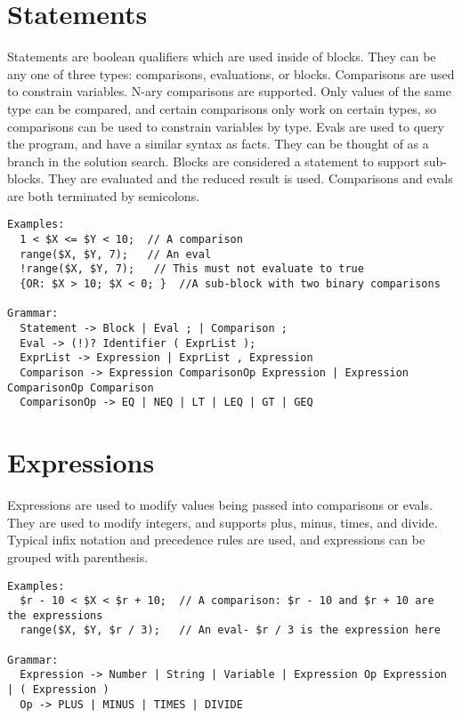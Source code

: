 \documentclass[onecolumn,titlepage]{article}
\begin{document}
\section{Statements}
Statements are boolean qualifiers which are used inside of blocks.  They can be any one
of three types: comparisons, evaluations, or blocks. Comparisons are used to constrain variables.
N-ary comparisons are supported.  Only values of the same type can be compared, and certain
comparisons only work on certain types, so comparisons can be used to constrain variables by 
type.  Evals are used to query the program, and have a similar syntax as facts.  They can be thought
of as a branch in the solution search.  Blocks are considered a statement to support sub-blocks.
They are evaluated and the reduced result is used.  Comparisons and evals are both terminated
by semicolons.

\begin{verbatim}
Examples:
  1 < $X <= $Y < 10;  // A comparison
  range($X, $Y, 7);   // An eval
  !range($X, $Y, 7);   // This must not evaluate to true
  {OR: $X > 10; $X < 0; }  //A sub-block with two binary comparisons

Grammar:
  Statement -> Block | Eval ; | Comparison ;
  Eval -> (!)? Identifier ( ExprList );
  ExprList -> Expression | ExprList , Expression
  Comparison -> Expression ComparisonOp Expression | Expression ComparisonOp Comparison
  ComparisonOp -> EQ | NEQ | LT | LEQ | GT | GEQ
\end{verbatim}

\section{Expressions}
Expressions are used to modify values being passed into comparisons or evals.  They are
used to modify integers, and supports plus, minus, times, and divide.  Typical infix
notation and precedence rules are used, and expressions can be grouped with parenthesis.

\begin{verbatim}
Examples:
  $r - 10 < $X < $r + 10;  // A comparison: $r - 10 and $r + 10 are the expressions
  range($X, $Y, $r / 3);   // An eval- $r / 3 is the expression here

Grammar:
  Expression -> Number | String | Variable | Expression Op Expression | ( Expression )
  Op -> PLUS | MINUS | TIMES | DIVIDE
\end{verbatim}
\end{document}
